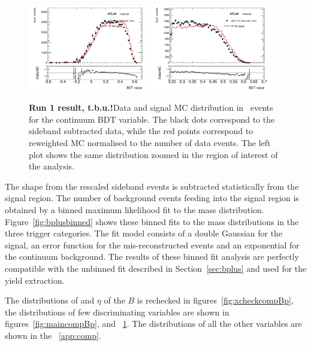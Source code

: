 %
\begin{figure}[!b]
\begin{center}
\hspace*{-0.4cm}
\includegraphics[width=0.47\textwidth]{figures/InternalNote_DataMCComparison/compRun1/Bp/bplus_BDT.pdf}
\hspace*{-0.4cm}
\includegraphics[width=0.47\textwidth]{figures/InternalNote_DataMCComparison/compRun1/Bp/bplus_BDTzoomed.pdf}
\caption{\textbf{Run 1 result, t.b.u.!}Data and signal MC distribution in \BpKpJpsi\ events for the
continuum BDT variable.
The black dots correspond to the sideband subtracted data, while 
the red points correspond to reweighted MC normalised to the number
of data events. The left plot shows the same distribution zoomed
in the region of interest of the analysis.}
\label{fig:maincompBpBDT}
\end{center}
\end{figure}
%
The shape from the rescaled sideband events is subtracted statistically
from the signal region. The number of background events
feeding into the signal region is obtained by a binned
maximum likelihood fit to the mass distribution.
Figure~\ref{fig:bplusbinned} shows these binned fits to
the mass distributions in the three trigger categories.
The fit model consists of a double Gaussian for
the signal, an error function for the
mis-reconstructed events and an exponential for the continuum
background.
The results of these binned fit analysis are perfectly 
compatible with the unbinned fit described in
Section~\ref{sec:bplus} and used for the yield extraction.

The distributions of \pt{} and $\eta{}$ of the $B$ is rechecked in
figures~\ref{fig:xcheckcompBp}, the distributions of few
discriminating variables are shown in figures~\ref{fig:maincompBp},
and ~\ref{fig:maincompBpBDT}.
The distributions of all the other variables are shown in the
~\ref{app:comp}.


